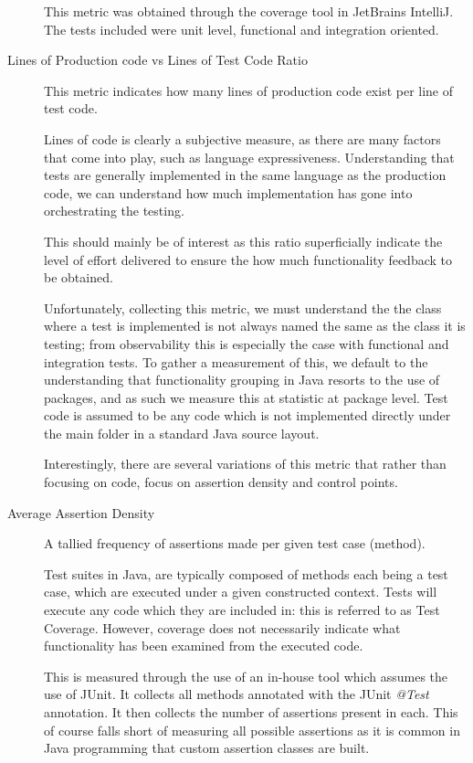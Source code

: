 \begin{description}
	This metric was obtained through the coverage tool in JetBrains IntelliJ. The tests included were unit level, functional and integration oriented. 
		
	\item [Lines of Production code vs Lines of Test Code Ratio] This metric indicates how many lines of production code exist per line of test code. 
	
	Lines of code is clearly a subjective measure, as there are many factors that come into play, such as language expressiveness. Understanding that tests are generally implemented in the same language as the production code, we can understand how much implementation has gone into orchestrating the testing. 
	
	This should mainly be of interest as this ratio superficially indicate the level of effort delivered to ensure the how much functionality feedback to be obtained. 
	
	Unfortunately, collecting this metric, we must understand the the class where a test is implemented is not always named the same as the class it is testing; from observability this is especially the case with functional and integration tests. To gather a measurement of this, we default to the understanding that functionality grouping in Java resorts to the use of packages, and as such we measure this at statistic at package level. Test code is assumed to be any code which is not implemented directly under the main folder in a standard Java source layout. 
	
	Interestingly, there are several variations of this metric that rather than focusing on code, focus on assertion density and control points.
	
	\item [Average Assertion Density] A tallied frequency of assertions made per given test case (method).
	
	Test suites in Java, are typically composed of methods each being a test case, which are executed under a given constructed context. Tests will execute any code which they are included in: this is referred to as Test Coverage. However, coverage does not necessarily indicate what functionality has been examined from the executed code.
	
	This is measured through the use of an in-house tool which assumes the use of JUnit. It collects all methods annotated with the JUnit \textit{@Test} annotation. It then collects the number of assertions present in each. This of course falls short of measuring all possible assertions as it is common in Java programming that custom assertion classes are built. 
	

\end{description}
